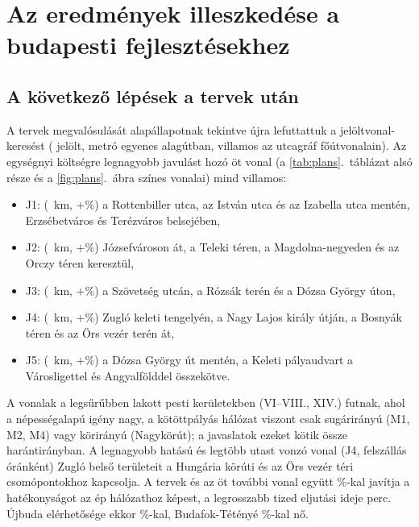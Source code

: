 \documentclass[12pt,a4paper]{article}
\theoremstyle{definition}
\theoremstyle{remark}
\begin{document}
\section{Az eredmények illeszkedése a budapesti fejlesztésekhez}
\label{sec:hozzajarulas}

\subsection{A következő lépések a tervek után}

A tervek megvalósulását alapállapotnak tekintve újra lefuttattuk a
jelöltvonal-keresést (\NCAND{} jelölt, metró egyenes alagútban, villamos az
utcagráf főútvonalain). Az egységnyi költségre legnagyobb javulást hozó öt
vonal (a \ref{tab:plans}.~táblázat alsó része és a \ref{fig:plans}.~ábra
színes vonalai) mind villamos:
\begin{itemize}
  \item J1: \JNAMEA{} (\JLENA~km, $+$\JGAINA\%) a Rottenbiller utca, az
    István utca és az Izabella utca mentén, Erzsébetváros és Terézváros
    belsejében,
  \item J2: \JNAMEB{} (\JLENB~km, $+$\JGAINB\%) Józsefvároson át, a Teleki
    téren, a Magdolna-negyeden és az Orczy téren keresztül,
  \item J3: \JNAMEC{} (\JLENC~km, $+$\JGAINC\%) a Szövetség utcán, a Rózsák
    terén és a Dózsa György úton,
  \item J4: \JNAMED{} (\JLEND~km, $+$\JGAIND\%) Zugló keleti tengelyén, a
    Nagy Lajos király útján, a Bosnyák téren és az Örs vezér terén át,
  \item J5: \JNAMEE{} (\JLENE~km, $+$\JGAINE\%) a Dózsa György út
    mentén, a Keleti pályaudvart a Városligettel és Angyalfölddel összekötve.
\end{itemize}
A vonalak a legsűrűbben lakott pesti kerületekben (VI--VIII., XIV.) futnak,
ahol a népességalapú igény nagy, a kötöttpályás hálózat viszont csak sugárirányú
(M1, M2, M4) vagy körirányú (Nagykörút); a javaslatok ezeket kötik össze
harántirányban. A legnagyobb hatású és legtöbb utast vonzó vonal (J4,
\JBOARDD{} felszállás óránként) Zugló belső területeit a Hungária körúti és
az Örs vezér téri csomópontokhoz kapcsolja.
A tervek és az öt további vonal együtt \AFTERGAIN\%-kal javítja a
hatékonyságot az ép hálózathoz képest, a legrosszabb tized eljutási ideje
\AFTERES{} perc. Újbuda elérhetősége ekkor \AFTDXI\%-kal, Budafok-Tétényé
\AFTDXXII\%-kal nő.
\end{document}
